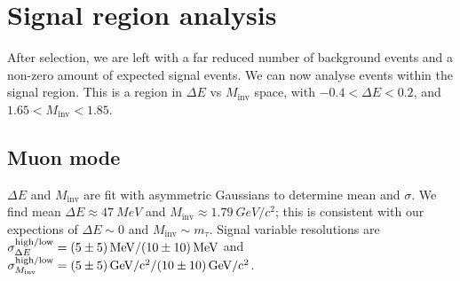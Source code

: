 \documentclass[12pt]{thesis}  %
\begin{document}
\chapter{Signal region analysis}

After selection, we are left with a far reduced number of background events and a non-zero amount of expected signal events. We can now analyse events within the signal region. This is a region in $\Delta E$ vs $M_{\text{inv}}$ space, with $-0.4 < \Delta E < 0.2$, and $1.65 < M_{\text{inv}} < 1.85$.


\section{Muon mode}

$\Delta E$ and $M_{\text{inv}}$ are fit with asymmetric Gaussians to determine mean and $\sigma$. We find mean $\Delta E \approx \SI{47}{MeV}$ and $M_{\text{inv}} \approx \SI{1.79}{GeV/c^2}$; this is consistent with our expections of $\Delta E \sim 0$ and $M_{\text{inv}} \sim m_{\tau}$. Signal variable resolutions are $\sigma^{\text{high/low}}_{\Delta E}=\SI{5 \pm 5}{MeV}/\SI{10 \pm 10}{MeV}$ and $\sigma^{\text{high/low}}_{M_{\text{inv}}}=\SI{5 \pm 5}{GeV/c^2}/\SI{10 \pm 10}{GeV/c^2}$.
\end{document}
